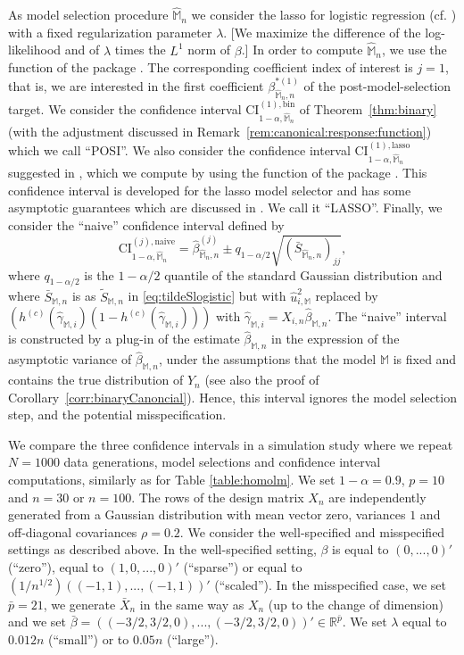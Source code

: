 \documentclass[preprint]{imsart}
\newcommand{\M}{\mathbb M}
\numberwithin{equation}{section}
\begin{document}
As model selection procedure $\hat{\M}_n$ we consider the lasso for logistic regression (cf. \cite{friedman2010regularization}) with a fixed regularization parameter $\lambda$. [We maximize the difference of the log-likelihood and of $\lambda$ times the $L^1$ norm of $\beta$.] In order to compute $\hat{\M}_n$, we use the function \verb@glmnet@ of the \verb@R@ package \verb@glmnet@. The corresponding coefficient index of interest is $j = 1$, that is, we are interested in the first coefficient $\beta_{\hat{\M}_n,n}^{*(1)}$ of the post-model-selection target. We consider the confidence interval $\mathrm{CI}_{1-\alpha, \hat{\mathbb{M}}_n}^{(1), \mathrm{bin}}$ of Theorem~\ref{thm:binary} (with the adjustment discussed in Remark~\ref{rem:canonical:response:function}) which we call ``POSI''. We also consider the confidence interval $\mathrm{CI}_{1-\alpha, \hat{\mathbb{M}}_n}^{(1), \mathrm{lasso}}$ suggested in \cite{taylor17post}, which we compute by using the function \verb@fixedLassoInf@ of the \verb@R@ package \verb@selectiveInference@. This confidence interval is developed for the lasso model selector and has some asymptotic guarantees which are discussed in \cite{taylor17post}. We call it ``LASSO''.  Finally, we consider the ``naive'' confidence interval defined by
\begin{equation} \label{eq:naive:CI:logistic}
\mathrm{CI}_{1-\alpha, \hat{\mathbb{M}}_n}^{(j), \mathrm{naive}}
=
\hat{\beta}^{(j)}_{\hat{\mathbb{M}}_n, n} \pm
q_{1-\alpha/2}
\sqrt{ (\bar{S}_{\hat{\M}_n,n})_{jj} },
\end{equation}
where $q_{1-\alpha/2}$ is the $1-\alpha/2$ quantile of the standard Gaussian distribution and where $\bar{S}_{\M,n}$ is as $\tilde{S}_{\M,n}$ in \eqref{eq:tildeSlogistic} but with $\hat{u}^2_{i,\M}$ replaced by
$(h^{(c)}(\hat{\gamma}_{\M,i})(1-h^{(c)}(\hat{\gamma}_{\M,i})))$
with $\hat{\gamma}_{\M,i} = X_{i,n} \hat{\beta}_{\M,n}$. The ``naive'' interval is constructed by a plug-in of the estimate $\hat{\beta}_{\M,n}$ in the expression of the asymptotic variance of $\hat{\beta}_{\M,n}$, under the assumptions that the model $\M$ is fixed and contains the true distribution of $Y_n$ (see also the proof of Corollary~\ref{corr:binaryCanoncial}). Hence, this interval ignores the model selection step, and the potential misspecification. 

We compare the three confidence intervals in a simulation study where we repeat $N=1000$ data generations, model selections and confidence interval computations, similarly as for Table \ref{table:homolm}.  We set $1-\alpha=0.9$, $p=10$ and $n=30$ or $n=100$. The rows of the design matrix $X_n$ are independently generated from a Gaussian distribution with mean vector zero, variances $1$ and off-diagonal covariances $\rho = 0.2$.
We consider the well-specified and misspecified settings as described above. In the well-specified setting, $\beta$ is equal to $(0,...,0)'$ (``zero''), equal to $(1,0,...,0)'$ (``sparse'') or equal to $(1/n^{1/2})( (-1,1),...,(-1,1) )'$ (``scaled''). In the misspecified case, we set $\bar{p} = 21$, we generate $\bar{X}_n$ in the same way as $X_n$ (up to the change of dimension) and we set $\bar{\beta} = ((-3/2,3/2,0),...,(-3/2,3/2,0))' \in \mathbb{R}^{\bar{p}}$. We set $\lambda$ equal to $0.012 n$ (``small'') or to $0.05 n$ (``large''). 
\end{document}
